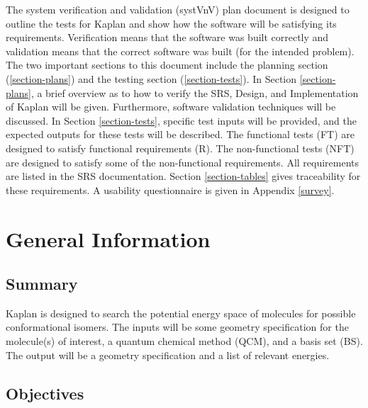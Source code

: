 \documentclass[12pt, titlepage]{article}
\newcommand{\progname}{Kaplan} %
\begin{document}
\listoffigures

\newpage


The system verification and validation (systVnV) plan document is designed to 
outline the tests for \progname{} and show how the software will be satisfying 
its requirements. Verification means that the software was built correctly and 
validation means that the correct software was built (for the intended 
problem). The two important sections to this document include the planning 
section (\ref{section-plans}) and the testing section (\ref{section-tests}). In 
Section \ref{section-plans}, a brief overview as to how to verify the SRS, 
Design, and Implementation of \progname{} will be given. Furthermore, software 
validation techniques will be discussed. In Section \ref{section-tests}, 
specific test inputs will be provided, and the expected outputs for these tests 
will be described. The functional tests (FT) are designed to satisfy functional 
requirements (R). The non-functional tests (NFT) are designed to satisfy some 
of the non-functional requirements. All requirements are listed in the SRS 
documentation. Section \ref{section-tables} gives traceability for these 
requirements. A usability questionnaire is given in Appendix \ref{survey}.


\section{General Information}

\subsection{Summary}

\progname{} is designed to search the potential energy space of molecules for 
possible conformational isomers. The inputs will be some geometry specification 
for the molecule(s) of interest, a quantum chemical method (QCM), and a basis 
set (BS). The output will be a geometry specification and a list of relevant 
energies. 


\subsection{Objectives}
\end{document}
